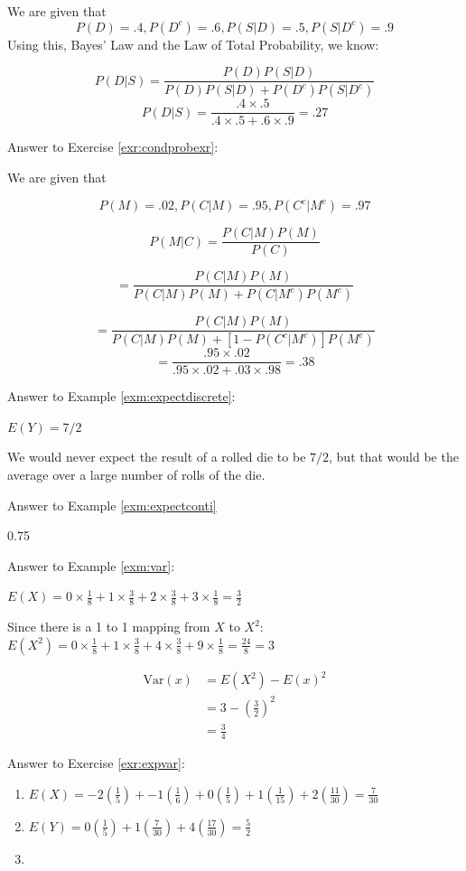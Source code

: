 \documentclass[]{book}
\theoremstyle{definition}
\theoremstyle{definition}
\theoremstyle{definition}
\theoremstyle{remark}
\begin{document}
We are given that
\[P(D) = .4, P(D^c) = .6, P(S|D) = .5, P(S|D^c) = .9\]
Using this, Bayes' Law and the Law of Total Probability, we know:

\[P(D|S) = \frac{P(D)P(S|D)}{P(D)P(S|D) + P(D^c)P(S|D^c)}\]
\[P(D|S) = \frac{.4 \times .5}{.4 \times .5 + .6 \times .9 } = .27\]

Answer to Exercise \ref{exr:condprobexr}:

We are given that

\[P(M) = .02, P(C|M) = .95, P(C^c|M^c) = .97\]

\[P(M|C) = \frac{P(C|M)P(M)}{P(C)}\]

\[= \frac{P(C|M)P(M)}{P(C|M)P(M) + P(C|M^c)P(M^c)}\]

\[= \frac{P(C|M)P(M)}{P(C|M)P(M) + [1-P(C^c|M^c)]P(M^c)}\]
\[ = \frac{.95 \times .02}{.95 \times .02 + .03 \times .98} = .38\]

Answer to Example \ref{exm:expectdiscrete}:

\(E(Y)=7/2\)

We would never expect the result of a rolled die to be \(7/2\), but that would be the average over a large number of rolls of the die.

Answer to Example \ref{exm:expectconti}

0.75

Answer to Example \ref{exm:var}:

\(E(X) = 0 \times \frac{1}{8} + 1 \times \frac{3}{8} + 2 \times \frac{3}{8} + 3 \times \frac{1}{8} = \frac{3}{2}\)

Since there is a 1 to 1 mapping from \(X\) to \(X^2:\) \(E(X^2) = 0 \times \frac{1}{8} + 1 \times \frac{3}{8} + 4 \times \frac{3}{8} + 9 \times \frac{1}{8} = \frac{24}{8} = 3\)

\begin{align*}
\text{Var}(x) &= E(X^2) - E(x)^2\\
&= 3 - (\frac{3}{2})^2\\
&= \frac{3}{4}
\end{align*}

Answer to Exercise \ref{exr:expvar}:

\begin{enumerate}
\def\labelenumi{\arabic{enumi}.}
\item
  \(E(X) = -2(\frac{1}{5}) + -1(\frac{1}{6}) + 0(\frac{1}{5}) + 1(\frac{1}{15}) + 2(\frac{11}{30}) = \frac{7}{30}\)
\item
  \(E(Y) = 0(\frac{1}{5}) + 1(\frac{7}{30}) + 4(\frac{17}{30}) = \frac{5}{2}\)
\item
\end{enumerate}
\end{document}

